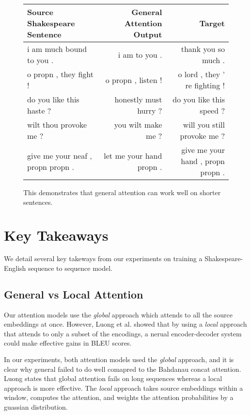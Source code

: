 \documentclass[twoside,twocolumn]{article}
\begin{document}
\begin{figure*}
    \centering
    \begin{tabular}{ |l|r|r| }
        \hline
        \textbf{Source Shakespeare Sentence}
          & \textbf{General Attention Output} & \textbf{Target} \\
        \hline
        i am much bound to you .          & i am to you .
        & thank you so much .             \\ \hline
        o propn , they fight !            & o propn , listen !
        & o lord , they ’ re fighting !   \\ \hline
        do you like this haste ?          & honestly must hurry ?
        & do you like this speed ?        \\ \hline
        wilt thou provoke me ?            & you wilt make me ?
        & will you still provoke me ?     \\ \hline
        give me your neaf , propn propn . & let me your hand propn .
        & give me your hand , propn propn . \\ \hline
    \end{tabular}

    \caption{ This demonstrates that general attention can work well on shorter sentences.}
    \label{fig:short-results}
\end{figure*}
\section{Key Takeaways}
\label{sec:key-takeaway}
We detail several key takeways from our experiments on training a
Shakespeare-English sequence to sequence model.
\subsection{General vs Local Attention}
\label{sec:key-attention}
Our attention models use the \emph{global} approach which attends to all the
source embeddings at once. However, Luong et al. \cite{luong2015effective}
showed that by using a \emph{local} approach that attends to only a subset
of the encodings, a nerual encoder-decoder system could make effective gains in
BLEU scores.

In our experiments, both attention models used the \emph{global} approach, and
it is clear why general failed to do well comapred to the Bahdanau concat
attention. Luong states that global attention fails on long sequences whereas
a local approach is more effective. The \emph{local} approach takes
source embeddings within a window, computes the attention, and weights the
attention probabilities by a guassian distribution.
\end{document}
